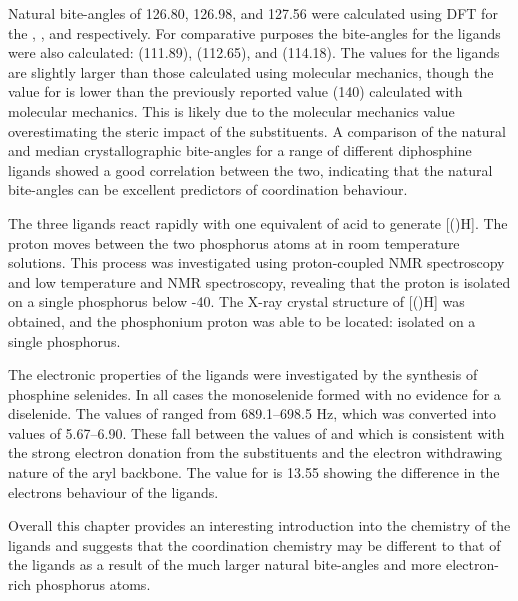 Natural bite-angles of 126.80, 126.98, and 127.56\degrees{} were calculated using DFT for the \tBusixantphos{}, \tButhixantphos, and \tBuxantphos{} respectively.  For comparative purposes the bite-angles for the \Phxantphos{} ligands were also calculated: \Phsixantphos{} (111.89\degrees), \Phthixantphos{} (112.65\degrees), and \Phxantphos{} (114.18\degrees).  The values for the \Phxantphos{} ligands are slightly larger than those calculated using molecular mechanics, though the value for \tBuxantphos{} is lower than the previously reported value (140\degrees) calculated with molecular mechanics.  This is likely due to the molecular mechanics value overestimating the steric impact of the \tBu{} substituents.  A comparison of the natural and median crystallographic bite-angles for a range of different diphosphine ligands showed a good correlation between the two, indicating that the natural bite-angles can be excellent predictors of coordination behaviour.  

The three \tBuxantphos{} ligands react rapidly with one equivalent of acid to generate [(\tBuxantphos)H].  The proton moves between the two phosphorus atoms at in room temperature solutions.  This process was investigated using proton-coupled \phosphorus{} NMR spectroscopy and low temperature \proton{} and \phosphorus{} NMR spectroscopy, revealing that the proton is isolated on a single phosphorus below -40\degC.  The X-ray crystal structure of [(\tButhixantphos)H] was obtained, and the phosphonium proton was able to be located: isolated on a single phosphorus.  

The electronic properties of the \tBuxantphos{} ligands were investigated by the synthesis of phosphine selenides.  In all cases the monoselenide formed with no evidence for a diselenide.  The values of \JPSe{} ranged from 689.1--698.5 Hz, which was converted into \pKb{} values of 5.67--6.90.  These fall between the values of  and  which is consistent with the strong electron donation from the \tBu{} substituents and the electron withdrawing nature of the aryl backbone.  The \pKb{} value for \Phxantphos{} is 13.55 showing the difference in the electrons behaviour of the \tBuxantphos{} ligands.

Overall this chapter provides an interesting introduction into the chemistry of the \tBuxantphos{} ligands and suggests that the coordination chemistry may be different to that of the \Phxantphos{} ligands as a result of the much larger natural bite-angles and more electron-rich phosphorus atoms.  














